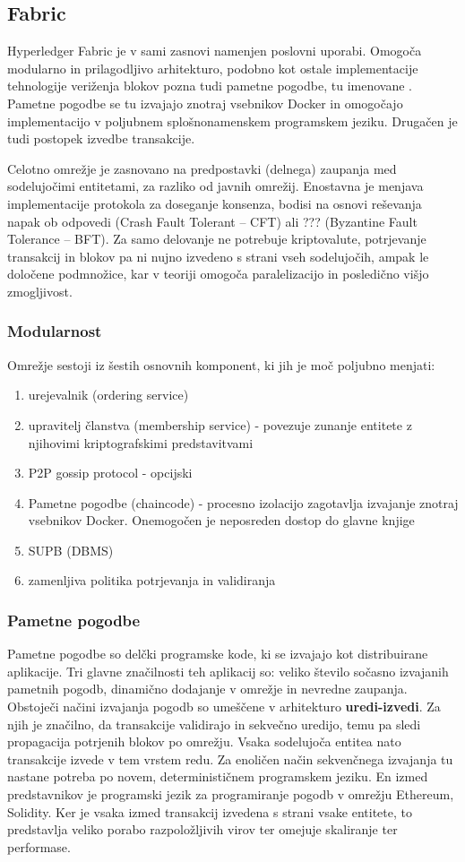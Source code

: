 \documentclass[a4paper, 12pt]{book}
\begin{document}
\subsection{Fabric}
Hyperledger Fabric je v sami zasnovi namenjen poslovni uporabi.
Omogoča modularno in prilagodljivo arhitekturo, podobno kot ostale implementacije tehnologije veriženja blokov pozna tudi pametne pogodbe, tu imenovane .
Pametne pogodbe se tu izvajajo znotraj vsebnikov Docker in omogočajo implementacijo v poljubnem splošnonamenskem programskem jeziku.
Drugačen je tudi postopek izvedbe transakcije.

Celotno omrežje je zasnovano na predpostavki (delnega) zaupanja med sodelujočimi entitetami, za razliko od javnih omrežij.
Enostavna je menjava implementacije protokola za doseganje konsenza, bodisi na osnovi reševanja napak ob odpovedi (Crash Fault Tolerant -- CFT) ali ??? (Byzantine Fault Tolerance -- BFT).
Za samo delovanje ne potrebuje kriptovalute, potrjevanje transakcij in blokov pa ni nujno izvedeno s strani vseh sodelujočih, ampak le določene podmnožice, kar v teoriji omogoča paralelizacijo in posledično višjo zmogljivost.

\subsubsection{Modularnost}
Omrežje sestoji iz šestih osnovnih komponent, ki jih je moč poljubno menjati:
\begin{enumerate}
	\item urejevalnik (ordering service)
	\item upravitelj članstva (membership service) - povezuje zunanje entitete z njihovimi kriptografskimi predstavitvami
	\item P2P gossip protocol - opcijski
	\item Pametne pogodbe (chaincode) - procesno izolacijo zagotavlja izvajanje znotraj vsebnikov Docker. 
	Onemogočen je neposreden dostop do glavne knjige
	\item SUPB (DBMS)
	\item zamenljiva politika potrjevanja in validiranja
\end{enumerate}

\subsubsection{Pametne pogodbe}
Pametne pogodbe so delčki programske kode, ki se izvajajo kot distribuirane aplikacije.
Tri glavne značilnosti teh aplikacij so: veliko število sočasno izvajanih pametnih pogodb, dinamično dodajanje v omrežje in nevredne zaupanja.
Obstoječi načini izvajanja pogodb so umeščene v arhitekturo \textbf{uredi-izvedi}.
Za njih je značilno, da transakcije validirajo in sekvečno uredijo, temu pa sledi propagacija potrjenih blokov po omrežju.
Vsaka sodelujoča entitea nato transakcije izvede v tem vrstem redu.
Za enoličen način sekvenčnega izvajanja tu nastane potreba po novem, determinističnem programskem jeziku.
En izmed predstavnikov je programski jezik za programiranje pogodb v omrežju Ethereum, Solidity.
Ker je vsaka izmed transakcij izvedena s strani vsake entitete, to predstavlja veliko porabo razpoložljivih virov ter omejuje skaliranje ter performase.
\end{document}
